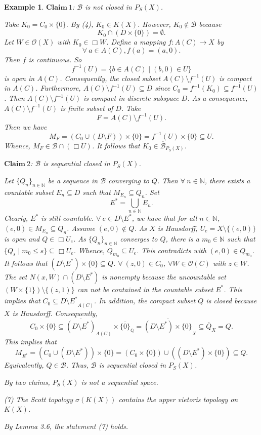 \documentclass[preprint,12pt]{elsarticle}
\numberwithin{equation}{section}
\newtheorem{example}[theorem]{Example}
\begin{document}
\begin{example}
{$\mathbf{Claim} \ 1$: $\mathcal{B}$ is not closed in $P_{S}(X)$.

Take $K_{0}=C_{0}\times\{0\}$. By (4), $K_{0}\in K(X)$. However, $K_{0}\not\in\mathcal{B}$ because $$K_{0}\cap (D\times\{0\})=\emptyset.$$
Let $W\in\mathcal{O}(X)$ with $K_{0}\in\Box W$. Define a mapping $f:A(C)\longrightarrow X$ by
$$\forall\ a\in A(C), f(a)=(a,0).$$
Then $f$ is continuous. So $$f^{-1}(U)=\{b\in A(C)\mid (b,0)\in U\}$$ is open in $A(C)$. Consequently, the closed subset $A(C)\setminus f^{-1}(U)$ is compact in $A(C)$. Furthermore, $A(C)\setminus f^{-1}(U)\subseteq D$ since $C_{0}=f^{-1}(K_{0})\subseteq f^{-1}(U)$. Then $A(C)\setminus f^{-1}(U)$ is compact in discrete subspace $D$. As a consequence, $A(C)\setminus f^{-1}(U)$ is finite subset of $D$. Take $$F=A(C)\setminus f^{-1}(U).$$ Then we have
$$M_{F}=(C_{0}\cup(D\setminus F))\times\{0\}=f^{-1}(U)\times\{0\}\subseteq U.$$
Whence, $M_{F}\in\mathcal{B}\cap(\Box U)$. It follows that $K_{0}\in\overline{\mathcal{B}}_{P_{S}(X)}$.

$\mathbf{Claim} \ 2$: $\mathcal{B}$ is sequential closed in $P_{S}(X)$.

Let $\{Q_{n}\}_{n\in\mathbb{N}}$ be a sequence in $\mathcal{B}$ converging to $Q$. Then $\forall\ n\in\mathbb{N}$, there exists a countable subset $E_{n}\subseteq D$ such that $M_{E_{n}}\subseteq Q_{n}$. Set $$E^{\ast}=\bigcup\limits_{n\in\mathbb{N}}E_{n}.$$ Clearly, $E^{\ast}$ is still countable. $\forall\ e\in D\setminus E^{\ast}$, we have that for all $n\in\mathbb{N}$, $(e,0)\in M_{E_{n}}\subseteq Q_{n}$. Assume $(e,0)\not\in Q$. As $X$ is Hausdorff, $U_{e}=X\setminus\{(e,0)\}$ is open and $Q\in\Box U_{e}$. As $\{Q_{n}\}_{n\in\mathbb{N}}$ converges to $Q$, there is a $m_{0}\in\mathbb{N}$ such that $\{Q_{s}\mid m_{0}\leq s\}\subseteq\Box U_{e}$. Whence, $Q_{m_{0}}\subseteq U_{e}$. This contradicts with $(e,0)\in Q_{m_{0}}$. It follows that $(D\setminus E^{\ast})\times\{0\}\subseteq Q$. $\forall\ (z,0)\in C_{0}$, $\forall W\in\mathcal{O}(C)$ with $z\in W$. The set $N(x,W)\cap (D\setminus E^{\ast})$ is nonempty because the uncountable set $(W\times\{1\})\setminus\{(z,1)\}$ can not be contained in the countable subset $E^{\ast}$. This implies that $C_{0}\subseteq\overline{D\setminus E^{\ast}}_{A(C)}$. In addition, the compact subset $Q$ is closed because $X$ is Hausdorff. Consequently, $$C_{0}\times\{0\}\subseteq\overline{(D\setminus E^{\ast})}_{A(C)}\times\overline{\{0\}}_{\mathbb{Q}}=\overline{(D\setminus E^{\ast})\times\{0\}}_{X}\subseteq \overline{Q}_{X}=Q.$$ This implies that
$$M_{E^{\ast}}=(C_{0}\cup(D\setminus E^{\ast}))\times\{0\}=(C_{0}\times\{0\})\cup((D\setminus E^{\ast})\times\{0\})\subseteq Q.$$ Equivalently, $Q\in\mathcal{B}$. Thus, $\mathcal{B}$ is sequential closed in $P_{S}(X)$.

By two claims, $P_{S}(X)$ is not a sequential space.

(7) The Scott topology $\sigma(K(X))$ contains the upper vietoris topology on $K(X)$.

By Lemma 3.6, the statement (7) holds.

}
\end{example}
\end{document}
